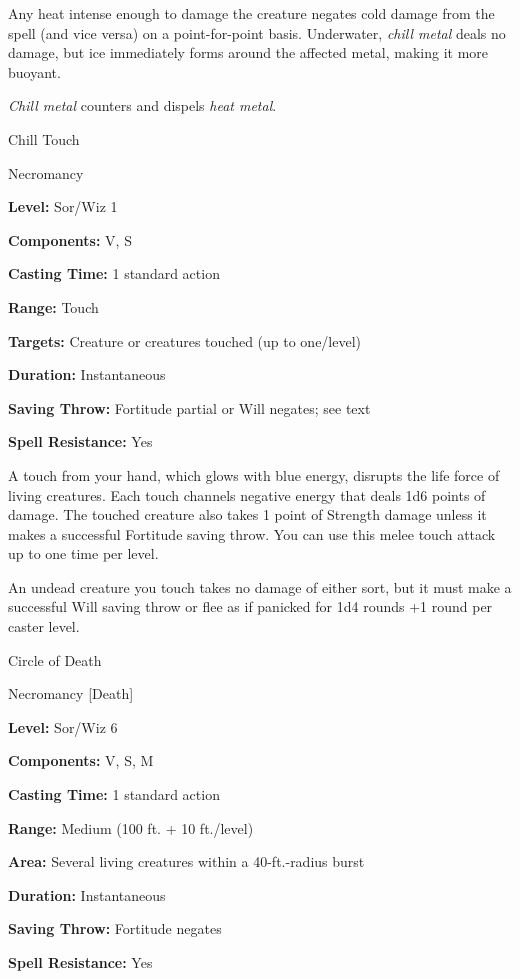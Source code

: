 \documentclass{article}
\begin{document}
Any heat intense enough to damage the creature negates cold damage from the spell 
(and vice versa) on a point-for-point basis. Underwater, \textit{chill metal }deals 
no damage, but ice immediately forms around the affected metal, making it more 
buoyant.

\textit{Chill metal }counters and dispels \textit{heat metal}.

\vspace{12pt}
Chill Touch

Necromancy

\textbf{Level:} Sor/Wiz 1

\textbf{Components:} V, S

\textbf{Casting Time:} 1 standard action

\textbf{Range:} Touch

\textbf{Targets:} Creature or creatures touched (up to one/level)

\textbf{Duration:} Instantaneous

\textbf{Saving Throw:} Fortitude partial or Will negates; see text

\textbf{Spell Resistance:} Yes

A touch from your hand, which glows with blue energy, disrupts the life force of 
living creatures. Each touch channels negative energy that deals 1d6 points of 
damage. The touched creature also takes 1 point of Strength damage unless it makes 
a successful Fortitude saving throw. You can use this melee touch attack up to 
one time per level.

An undead creature you touch takes no damage of either sort, but it must make a 
successful Will saving throw or flee as if panicked for 1d4 rounds +1 round per 
caster level.

\vspace{12pt}
Circle of Death

Necromancy [Death]

\textbf{Level:} Sor/Wiz 6

\textbf{Components:} V, S, M

\textbf{Casting Time:} 1 standard action

\textbf{Range: }Medium (100 ft. + 10 ft./level)

\textbf{Area:} Several living creatures within a 40-ft.-radius burst

\textbf{Duration:} Instantaneous

\textbf{Saving Throw:} Fortitude negates

\textbf{Spell Resistance:} Yes
\end{document}
